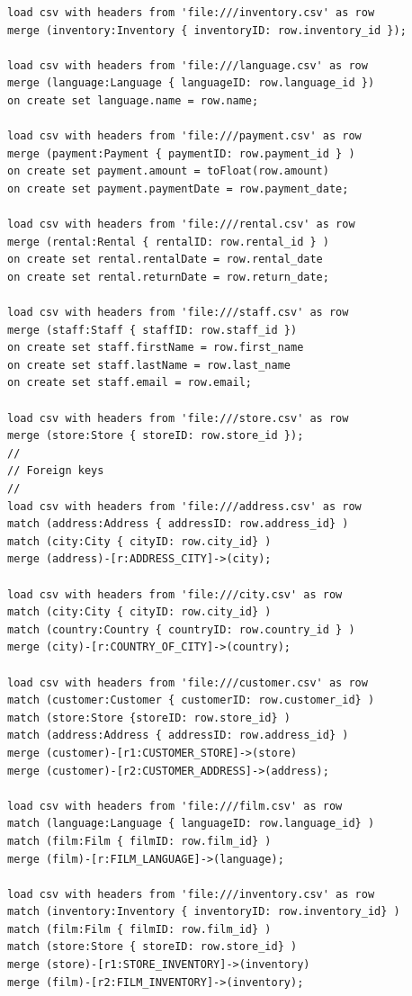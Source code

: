 \begin{withcode}
\begin{verbatim}
load csv with headers from 'file:///inventory.csv' as row
merge (inventory:Inventory { inventoryID: row.inventory_id });

load csv with headers from 'file:///language.csv' as row
merge (language:Language { languageID: row.language_id })
on create set language.name = row.name;

load csv with headers from 'file:///payment.csv' as row
merge (payment:Payment { paymentID: row.payment_id } )
on create set payment.amount = toFloat(row.amount)
on create set payment.paymentDate = row.payment_date;

load csv with headers from 'file:///rental.csv' as row
merge (rental:Rental { rentalID: row.rental_id } )
on create set rental.rentalDate = row.rental_date
on create set rental.returnDate = row.return_date;

load csv with headers from 'file:///staff.csv' as row
merge (staff:Staff { staffID: row.staff_id }) 
on create set staff.firstName = row.first_name
on create set staff.lastName = row.last_name
on create set staff.email = row.email;

load csv with headers from 'file:///store.csv' as row
merge (store:Store { storeID: row.store_id });
//
// Foreign keys
//
load csv with headers from 'file:///address.csv' as row
match (address:Address { addressID: row.address_id} )
match (city:City { cityID: row.city_id} )
merge (address)-[r:ADDRESS_CITY]->(city);

load csv with headers from 'file:///city.csv' as row
match (city:City { cityID: row.city_id} )
match (country:Country { countryID: row.country_id } )
merge (city)-[r:COUNTRY_OF_CITY]->(country);

load csv with headers from 'file:///customer.csv' as row
match (customer:Customer { customerID: row.customer_id} )
match (store:Store {storeID: row.store_id} )
match (address:Address { addressID: row.address_id} )
merge (customer)-[r1:CUSTOMER_STORE]->(store)
merge (customer)-[r2:CUSTOMER_ADDRESS]->(address);

load csv with headers from 'file:///film.csv' as row
match (language:Language { languageID: row.language_id} )
match (film:Film { filmID: row.film_id} )
merge (film)-[r:FILM_LANGUAGE]->(language);

load csv with headers from 'file:///inventory.csv' as row
match (inventory:Inventory { inventoryID: row.inventory_id} )
match (film:Film { filmID: row.film_id} )
match (store:Store { storeID: row.store_id} )
merge (store)-[r1:STORE_INVENTORY]->(inventory)
merge (film)-[r2:FILM_INVENTORY]->(inventory);


\end{verbatim}
\end{withcode}
